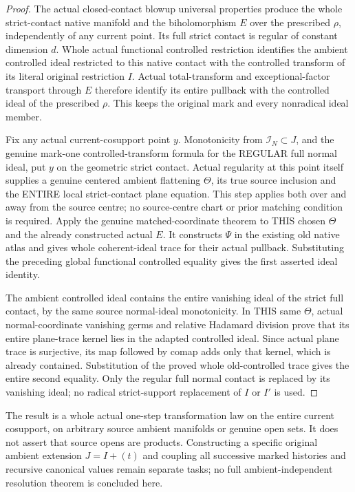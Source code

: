 \begin{proof}
The actual closed-contact blowup universal properties produce the whole
strict-contact native manifold and the biholomorphism $E$ over the prescribed
$\rho$, independently of any current point. Its full strict contact is regular
of constant dimension $d$. Whole actual functional controlled restriction
identifies the ambient controlled ideal restricted to this native contact
with the controlled transform of its literal original restriction $I$.
Actual total-transform and exceptional-factor transport through $E$ therefore
identify its entire pullback with the controlled ideal of the prescribed
$\rho$. This keeps the original mark and every nonradical ideal member.

Fix any actual current-cosupport point $y$. Monotonicity from
$\mathcal I_N\subset J$, and the genuine mark-one controlled-transform
formula for the REGULAR full normal ideal, put $y$ on the geometric strict
contact. Actual regularity at this point itself supplies a genuine centered
ambient flattening $\Theta$, its true source inclusion and the ENTIRE local
strict-contact plane equation. This step applies both over and away from the
source centre; no source-centre chart or prior matching condition is required.
Apply the genuine matched-coordinate theorem to THIS chosen $\Theta$ and the
already constructed actual $E$. It constructs $\Psi$ in the existing old
native atlas and gives whole coherent-ideal trace for their actual pullback.
Substituting the preceding global functional controlled equality gives the
first asserted ideal identity.

The ambient controlled ideal contains the entire vanishing ideal of the
strict full contact, by the same source normal-ideal monotonicity. In THIS
same $\Theta$, actual normal-coordinate vanishing germs and relative Hadamard
division prove that its entire plane-trace kernel lies in the adapted
controlled ideal. Since actual plane trace is surjective, its map followed by
comap adds only that kernel, which is already contained. Substitution of the
proved whole old-controlled trace gives the entire second equality. Only the
regular full normal contact is replaced by its vanishing ideal; no radical
strict-support replacement of $I$ or $I'$ is used.
\end{proof}

\begin{remark}
The result is a whole actual one-step transformation law on the entire
current cosupport, on arbitrary source ambient manifolds or genuine open
sets. It does not assert that source opens are products. Constructing a
specific original ambient extension $J=I+(t)$ and coupling all successive
marked histories and recursive canonical values remain separate tasks;
no full ambient-independent resolution theorem is concluded here.
\end{remark}
